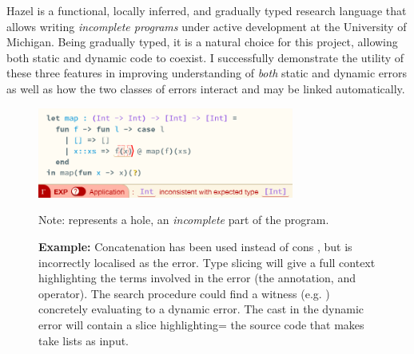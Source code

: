 Hazel \cite{Hazel} is a functional, locally inferred, and gradually typed research language that allows writing \textit{incomplete programs} under active development at the University of Michigan. Being gradually typed, it is a natural choice for this project, allowing both static and dynamic code to coexist. I successfully demonstrate the utility of these three features in improving understanding of \textit{both} static and dynamic errors as well as how the two classes of errors interact and may be linked automatically.



\begin{figure}
\centering
\includegraphics[width=0.75\textwidth]{Media/Figures/map_example_intro}

Note:  represents a hole, an \textit{incomplete} part of the program.
\caption{\textbf{Example:} Concatenation  has been used instead of cons \code{::}, but  is incorrectly localised as the error. Type slicing will give a full context highlighting the terms involved in the error (the annotation,  and  operator). The search procedure could find a witness (e.g. \code{[0]}) concretely evaluating to a dynamic error. The cast in the dynamic error will contain a slice highlighting= the source code that makes  take lists as input.}
\end{figure}

